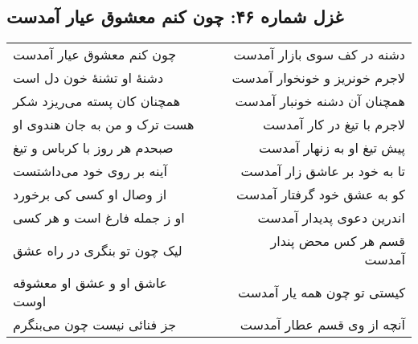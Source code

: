 \begin{center}
\section*{غزل شماره ۴۶: چون کنم معشوق عیار آمدست}
\label{sec:046}
\begin{longtable}{l p{0.5cm} r}
چون کنم معشوق عیار آمدست
&&
دشنه در کف سوی بازار آمدست
\\
دشنهٔ او تشنهٔ خون دل است
&&
لاجرم خونریز و خونخوار آمدست
\\
همچنان کان پسته می‌ریزد شکر
&&
همچنان آن دشنه خونبار آمدست
\\
هست ترک و من به جان هندوی او
&&
لاجرم با تیغ در کار آمدست
\\
صبحدم هر روز با کرباس و تیغ
&&
پیش تیغ او به زنهار آمدست
\\
آینه بر روی خود می‌داشتست
&&
تا به خود بر عاشق زار آمدست
\\
از وصال او کسی کی برخورد
&&
کو به عشق خود گرفتار آمدست
\\
او ز جمله فارغ است و هر کسی
&&
اندرین دعوی پدیدار آمدست
\\
لیک چون تو بنگری در راه عشق
&&
قسم هر کس محض پندار آمدست
\\
عاشق او و عشق او معشوقه اوست
&&
کیستی تو چون همه یار آمدست
\\
جز فنائی نیست چون می‌بنگرم
&&
آنچه از وی قسم عطار آمدست
\\
\end{longtable}
\end{center}
